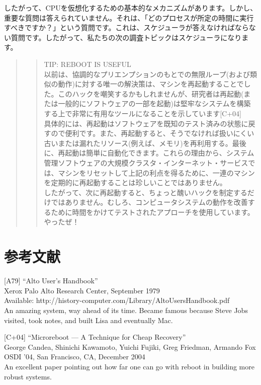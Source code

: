 したがって、CPUを仮想化するための基本的なメカニズムがあります。しかし、重要な質問は答えられていません。それは、「どのプロセスが所定の時間に実行すべきですか？」という質問です。これは、スケジューラが答えなければならない質問です。したがって、私たちの次の調査トピックはスケジューラになります。

\begin{quote}
\begin{quote}
TIP: REBOOT IS USEFUL\\
以前は、協調的なプリエンプションのもとでの無限ループ(および類似の動作)に対する唯一の解決策は、マシンを再起動することでした。このハックを嘲笑するかもしれませんが、研究者は再起動(または一般的にソフトウェアの一部を起動)は堅牢なシステムを構築する上で非常に有用なツールになることを示しています{[}C+04{]}\\
具体的には、再起動はソフトウェアを既知のテスト済みの状態に戻すので便利です。また、再起動すると、そうでなければ扱いにくい古いまたは漏れたリソース(例えば、メモリ)を再利用する。最後に、再起動は簡単に自動化できます。これらの理由から、システム管理ソフトウェアの大規模クラスタ・インターネット・サービスでは、マシンをリセットして上記の利点を得るために、一連のマシンを定期的に再起動することは珍しいことではありません。\\
したがって、次に再起動すると、ちょっと醜いハックを制定するだけではありません。むしろ、コンピュータシステムの動作を改善するために時間をかけてテストされたアプローチを使用しています。やったぜ！
\end{quote}
\end{quote}

\hypertarget{ux53c2ux8003ux6587ux732e-2}{%
\section*{参考文献}\label{ux53c2ux8003ux6587ux732e-2}}

{[}A79{]} ``Alto User's Handbook''\\
Xerox Palo Alto Research Center, September 1979\\
Available: http://history-computer.com/Library/AltoUsersHandbook.pdf\\
An amazing system, way ahead of its time. Became famous because Steve
Jobs visited, took notes, and built Lisa and eventually Mac.

{[}C+04{]} ``Microreboot --- A Technique for Cheap Recovery''\\
George Candea, Shinichi Kawamoto, Yuichi Fujiki, Greg Friedman, Armando
Fox\\
OSDI '04, San Francisco, CA, December 2004\\
An excellent paper pointing out how far one can go with reboot in
building more robust systems.

